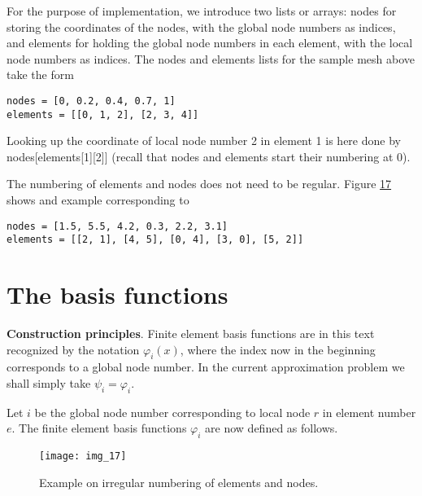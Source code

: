 \documentclass[../main.tex]{subfiles}
\begin{document}
For the purpose of implementation, we introduce two lists or arrays: nodes
for storing the coordinates of the nodes, with the global node numbers as indices,
and elements for holding the global node numbers in each element, with the
local node numbers as indices. The nodes and elements lists for the sample
mesh above take the form
\begin{lstlisting}[numbers=none]
nodes = [0, 0.2, 0.4, 0.7, 1]
elements = [[0, 1, 2], [2, 3, 4]]	
\end{lstlisting}
Looking up the coordinate of local node number 2 in element 1 is here done by
nodes[elements[1][2]] (recall that nodes and elements start their numbering
at 0).

The numbering of elements and nodes does not need to be regular. Figure \hyperref[fig:img_17]{17}
shows and example corresponding to
\begin{lstlisting}[numbers=none]
nodes = [1.5, 5.5, 4.2, 0.3, 2.2, 3.1]
elements = [[2, 1], [4, 5], [0, 4], [3, 0], [5, 2]]	
\end{lstlisting}
\section[The basis functions]{The basis functions}
\label{sec:sec_3_2}
\noindent \textbf{Construction principles}. Finite element basis functions are in this text recognized by the notation $\varphi_{i}(x)$, where the index now in the beginning corresponds to a global node number. In the current approximation problem we shall simply take $\psi_{i}=\varphi_{i}$.

Let $i$ be the global node number corresponding to local node $r$ in element number $e$. The finite element basis functions $\varphi_{i}$ are now defined as follows.
\begin{figure}[H]
	\centering
	\texttt{[image: img\_17]}
	\caption{Example on irregular numbering of elements and nodes.}
	\label{fig:img_17}
\end{figure}
\end{document}
